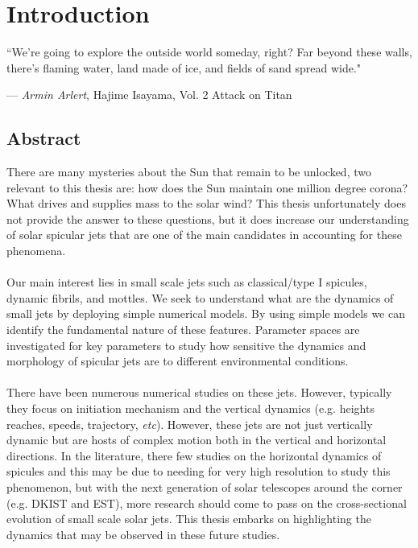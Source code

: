 \documentclass[12pt]{ociamthesis}
\newcommand{\np}{\\ \\}
\begin{document}
\chapter{Introduction}
\label{chap:intro}
\epigraph{``We're going to explore the outside world someday, right? Far beyond these walls, there's flaming water, land made of ice, and fields of sand spread wide."}{--- \textit{Armin Arlert}, \textup{Hajime Isayama}, Vol. 2  Attack on Titan}
\section{Abstract}
\label{sec:Abstract}
There are many mysteries about the Sun that remain to be unlocked, two relevant to this thesis are: how does the Sun maintain one million degree corona? What drives and supplies mass to the solar wind? This thesis unfortunately does not provide the answer to these questions, but it does increase our understanding of solar spicular jets that are one of the main candidates in accounting for these phenomena. \np
%
Our main interest lies in small scale jets such as classical/type I spicules, dynamic fibrils, and mottles. We seek to understand what are the dynamics of small jets by deploying simple numerical models. By using simple models we can identify the fundamental nature of these features. Parameter spaces are investigated for key parameters to study how sensitive the dynamics and morphology of spicular jets are to different environmental conditions. \np
%
There have been numerous numerical studies on these jets. However, typically they focus on initiation mechanism and the vertical dynamics (e.g. heights reaches, speeds, trajectory, \textit{etc}). However, these jets are not just vertically dynamic but are hosts of complex motion both in the vertical and horizontal directions. In the literature, there few studies on the horizontal dynamics of spicules and this may be due to needing for very high resolution to study this phenomenon, but with the next generation of solar telescopes around the corner (e.g. DKIST and EST), more research should come to pass on the cross-sectional evolution of small scale solar jets. This thesis embarks on highlighting the dynamics that may be observed in these future studies.
\end{document}
